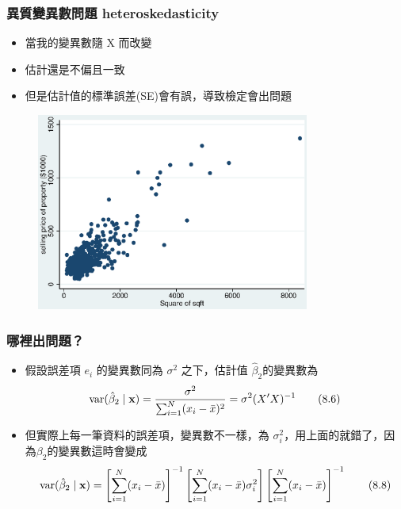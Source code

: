 \begin{frame}
    \frametitle{異質變異數問題 heteroskedasticity}

    \begin{itemize}
        \item 當我的變異數隨 X 而改變
        \item 估計還是不偏且一致
        \item 但是估計值的標準誤差(SE)會有誤，導致檢定會出問題
    \end{itemize}
    \begin{figure}
        \includegraphics[width=0.8\textwidth]{figure/Heter_smaple.eps}
    \end{figure}
\end{frame}

\begin{frame}
    \frametitle{哪裡出問題？}
    \begin{itemize}
        \item 假設誤差項 $e_i$ 的變異數同為 $\sigma^2$ 之下，估計值 $\hat{\beta}_2$的變異數為
        \begin{equation}
            \operatorname{var}(\hat{\beta}_2 \mid \mathbf{x}) = \frac{\sigma^2}{\sum_{i=1}^N (x_i - \bar{x})^2}
            =\sigma^2 (X'X)^{-1}
            \tag{8.6}
        \end{equation}
        \item 但實際上每一筆資料的誤差項，變異數不一樣，為 $\sigma_i^2$，用上面的就錯了，因為$\beta_2$的變異數這時會變成
        \begin{equation}
            \operatorname{var}(\hat{\beta}_2 \mid \mathbf{x})=
            \left[
                \sum_{i=1}^N(x_i - \bar{x})
            \right]^{-1}
            \left[
                \sum_{i=1}^N(x_i - \bar{x})\sigma_i^2
            \right]
            \left[
                \sum_{i=1}^N(x_i - \bar{x})
            \right]^{-1}
            \tag{8.8}
        \end{equation}
    \end{itemize}
\end{frame}

